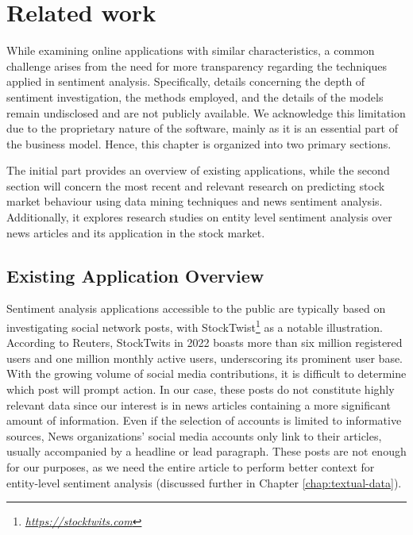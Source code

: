 \chapter{Related work}
\label{chap:related-work}
While examining online applications with similar characteristics, a common challenge arises from the need for more transparency regarding the techniques applied in sentiment analysis. Specifically, details concerning the depth of sentiment investigation, the methods employed, and the details of the models remain undisclosed and are not publicly available. We acknowledge this limitation due to the proprietary nature of the software, mainly as it is an essential part of the business model. Hence, this chapter is organized into two primary sections. 

The initial part provides an overview of existing applications, while the second section will concern the most recent and relevant research on predicting stock market behaviour using data mining techniques and news sentiment analysis. Additionally, it explores research studies on entity level sentiment analysis over news articles and its application in the stock market.

\section{Existing Application Overview}
\label{sec:existing-application-overview}

Sentiment analysis applications accessible to the public are typically based on investigating social network posts, with StockTwist\footnote{\href{https://stocktwits.com}{\textit{https://stocktwits.com}}} as a notable illustration. According to Reuters, StockTwits in 2022 boasts more than six million registered users and one million monthly active users, underscoring its prominent user base. With the growing volume of social media contributions, it is difficult to determine which post will prompt action. In our case, these posts do not constitute highly relevant data since our interest is in news articles containing a more significant amount of information. Even if the selection of accounts is limited to informative sources, News organizations' social media accounts only link to their articles, usually accompanied by a headline or lead paragraph. These posts are not enough for our purposes, as we need the entire article to perform better context for entity-level sentiment analysis (discussed further in Chapter \ref{chap:textual-data}).

